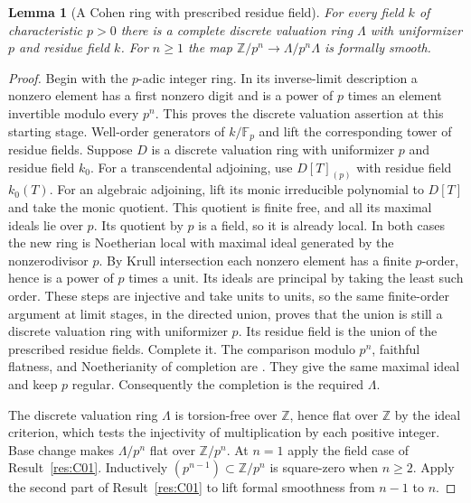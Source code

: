 \documentclass[11pt,oneside,openany]{book}
\newtheorem{lemma}[theorem]{Lemma}
\theoremstyle{definition}
\theoremstyle{remark}
\begin{document}
\begin{lemma}[A Cohen ring with prescribed residue field]\label{res:C02}
For every field \(k\) of characteristic \(p>0\) there is a complete
discrete valuation ring \(\Lambda\) with uniformizer \(p\) and residue
field \(k\). For \(n\ge1\) the map
\(\mathbb Z/p^n\to\Lambda/p^n\Lambda\) is formally smooth.
\end{lemma}
\begin{proof}
Begin with the \(p\)-adic integer ring. In its inverse-limit
description a nonzero element has a first nonzero digit and is a power
of \(p\) times an element invertible modulo every \(p^n\). This proves
the discrete valuation assertion at this starting stage.
Well-order generators of \(k/\mathbb F_p\) and lift the corresponding
tower of residue fields. Suppose \(D\) is a discrete valuation ring
with uniformizer \(p\) and residue field \(k_0\). For a transcendental
adjoining, use \(D[T]_{(p)}\) with residue field \(k_0(T)\).
For an algebraic adjoining, lift its monic irreducible polynomial to
\(D[T]\) and take the monic quotient. This quotient is finite free,
and all its maximal ideals lie over \(p\). Its quotient by \(p\)
is a field, so it is already local. In both cases the new ring
is Noetherian local with maximal ideal generated by the
nonzerodivisor \(p\). By Krull intersection each nonzero element
has a finite \(p\)-order, hence is a power of \(p\) times a unit.
Its ideals are principal by taking the least such order. These steps
are injective and take units to units, so the same finite-order
argument at limit stages, in the directed union, proves that the
union is still a discrete valuation ring with uniformizer \(p\).
Its residue field is the union of the prescribed residue fields.
Complete it. The comparison modulo \(p^n\), faithful flatness, and
Noetherianity of completion are
\cite[ALG-05-C04-S01]{p103}. They give the same maximal ideal and
keep \(p\) regular. Consequently the completion is the required
\(\Lambda\).

The discrete valuation ring \(\Lambda\) is torsion-free over
\(\mathbb Z\), hence flat over \(\mathbb Z\) by the ideal criterion, which
tests the injectivity of multiplication by each positive integer.
Base change makes \(\Lambda/p^n\) flat over \(\mathbb Z/p^n\).
At \(n=1\) apply the field case of Result~\ref{res:C01}. Inductively
\((p^{n-1})\subset\mathbb Z/p^n\) is square-zero when \(n\ge2\).
Apply the second part of Result~\ref{res:C01} to lift formal
smoothness from \(n-1\) to \(n\).
\end{proof}
\end{document}
